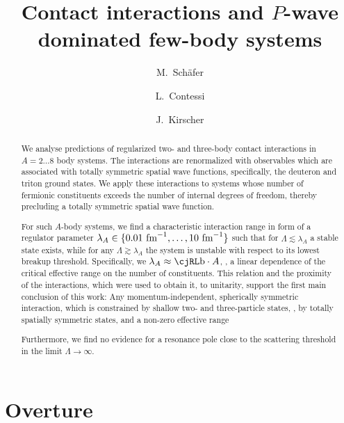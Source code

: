 \documentclass[aps,prd,onecolumn
,tightenlines,letterpaper,
notitlepage,11pt,linenumbers,
nofootinbib]{revtex4-1}
\begin{document}
\newenvironment{definition}[1][Definition]{\begin{trivlist}
\item[\hskip \labelsep {\textrm{\bfseries#1}}]}{\end{trivlist}}

 \author{M.~Sch\"afer}
 \author{L.~Contessi}
 \author{J.~Kirscher}


\title{
Contact interactions and $P$-wave dominated few-body systems
}
\begin{abstract}
We analyse predictions of regularized two- and three-body contact interactions
in $A=2\ldots8$ body systems. The interactions are renormalized with observables
which are associated with totally symmetric spatial wave functions, specifically, the
deuteron and triton ground states.
We apply these interactions to systems whose number of fermionic constituents exceeds the number of
internal degrees of freedom, thereby precluding a totally symmetric spatial wave function.

For such $A$-body systems, we find a characteristic interaction range in form of a regulator parameter $\lambda_A\in\lbrace 0.01~\text{fm}^{-1}, \ldots,10~\text{fm}^{-1}\rbrace$
such that for $\Lambda\lesssim\lambda_A$ a stable state exists, while for any $\Lambda\gtrsim\lambda_A$ the system is unstable
with respect to its lowest breakup threshold. Specifically, we $\lambda_A\approx\b\cdot A$, \ie, a linear dependence of the critical
effective range on the number of constituents. This relation and the proximity of the interactions, which were used to obtain it, to unitarity,
support the first main conclusion of this work: Any momentum-independent, spherically symmetric interaction, which is
constrained by shallow two- and three-particle states, \ie, by totally spatially symmetric states, and a non-zero effective range


 Furthermore, we find no evidence for a resonance pole close to the scattering
threshold in the limit $\Lambda\to\infty$.

\end{abstract}


\maketitle

\section{Overture}
\end{document}
